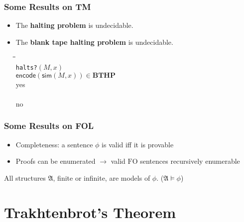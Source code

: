 \documentclass{beamer}
\newcommand{\FO}{\ensuremath{\mathrm{FO}}}
\newcommand{\structa}{\ensuremath{\mathfrak{A}}}
\begin{document}
\begin{frame}
  \frametitle{Some Results on TM}

  \begin{itemize}
    \item The \textbf{halting problem} is undecidable.
    \item The \textbf{blank tape halting problem} is undecidable.
      \begin{center}
        \begin{boxedminipage}{.5\textwidth}
          \begin{tabbing}
            \quad\=\quad\=\quad\=\kill\\
                {\tt halts?}$(M,x)$\\
                 $\mathsf{encode}(\mathsf{sim}(M, x)) \in \mathbf{BTHP}$\\
                \>\>yes\\
                \\
                \>\>no\\
          \end{tabbing}
        \end{boxedminipage}
      \end{center}
  \end{itemize}

  
\end{frame}

\begin{frame}
  \frametitle{Some Results on FOL}

  \begin{itemize}
    \item Completeness: a sentence $\phi$ is valid iff it is provable
    \item Proofs can be enumerated $\longrightarrow$ valid $\FO$ sentences
    recursively enumerable
  \end{itemize}

  \begin{definition}[Validity]
    All structures $\structa$, finite or infinite, are models of $\phi$.
    ($\structa \models \phi$)
  \end{definition}
  
\end{frame}

\section{Trakhtenbrot's Theorem}
\end{document}
